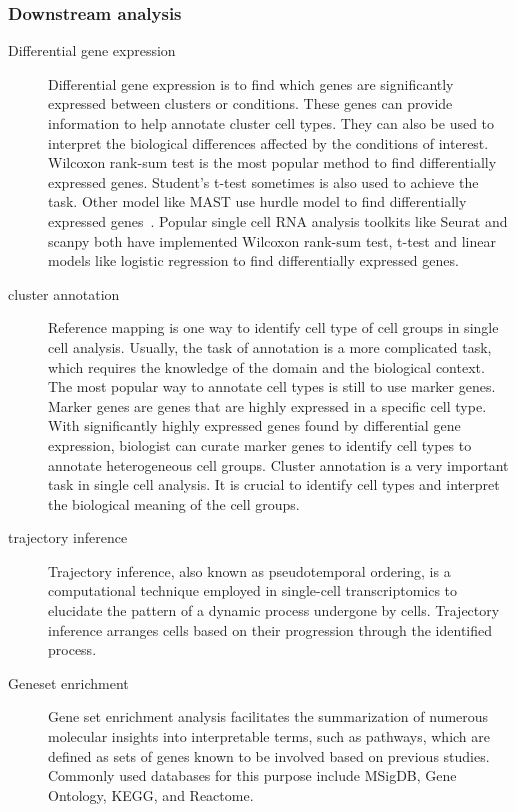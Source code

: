 \subsubsection{Downstream analysis}
\begin{description}
	\item[Differential gene expression] Differential gene expression is to find which genes are significantly expressed between clusters or conditions. These genes can provide information to help annotate cluster cell types. They can also be used to interpret the biological differences affected by the conditions of interest. Wilcoxon rank-sum test is the most popular method to find differentially expressed genes. Student's t-test sometimes is also used to achieve the task. Other model like MAST use hurdle model to find differentially expressed genes~\citep{finak2015mast}. Popular single cell RNA analysis toolkits like Seurat and scanpy both have implemented Wilcoxon rank-sum test, t-test and linear models like logistic regression to find differentially expressed genes.
	\item[cluster annotation] Reference mapping is one way to identify cell type of cell groups in single cell analysis. Usually, the task of annotation is a more complicated task, which requires the knowledge of the domain and the biological context. The most popular way to annotate cell types is still to use marker genes. Marker genes are genes that are highly expressed in a specific cell type. With significantly highly expressed genes found by differential gene expression, biologist can curate marker genes to identify cell types to annotate heterogeneous cell groups. Cluster annotation is a very important task in single cell analysis. It is crucial to identify cell types and interpret the biological meaning of the cell groups. 
	\item[trajectory inference] Trajectory inference, also known as pseudotemporal ordering, is a computational technique employed in single-cell transcriptomics to elucidate the pattern of a dynamic process undergone by cells. Trajectory inference arranges cells based on their progression through the identified process. 
	\item[Geneset enrichment] Gene set enrichment analysis facilitates the summarization of numerous molecular insights into interpretable terms, such as pathways, which are defined as sets of genes known to be involved based on previous studies. Commonly used databases for this purpose include MSigDB, Gene Ontology, KEGG, and Reactome. 
\end{description}

